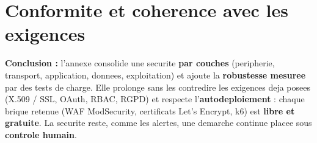 \section{Conformite et coherence avec les exigences}
\begin{encadre}
\textbf{Conclusion :} l'annexe consolide une securite \textbf{par couches}
(peripherie, transport, application, donnees, exploitation) et ajoute la
\textbf{robustesse mesuree} par des tests de charge. Elle prolonge sans les
contredire les exigences deja posees (X.509 / SSL, OAuth, RBAC, RGPD) et respecte
l'\textbf{autodeploiement} : chaque brique retenue (WAF ModSecurity, certificats
Let's Encrypt, k6) est \textbf{libre et gratuite}. La securite reste, comme les
alertes, une demarche continue placee sous \textbf{controle humain}.
\end{encadre}
